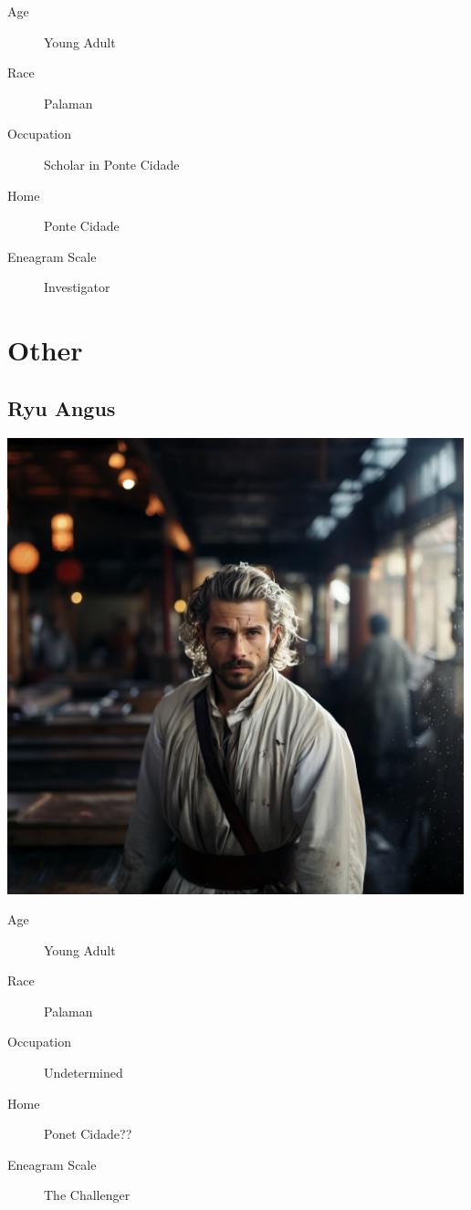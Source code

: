 \documentclass[11pt]{article}
\begin{document}
\begin{description}
\item[{Age}] Young Adult
\item[{Race}] Palaman
\item[{Occupation}] Scholar in Ponte Cidade
\item[{Home}] Ponte Cidade
\item[{Eneagram Scale}] Investigator
\end{description}
\section*{Other}
\label{sec:org814c882}
\subsection*{Ryu Angus}
\label{sec:org85082f9}

\begin{center}
\includegraphics[width=500px]{./img/Ryu_Angus.png}
\end{center}

\begin{description}
\item[{Age}] Young Adult
\item[{Race}] Palaman
\item[{Occupation}] Undetermined
\item[{Home}] Ponet Cidade??
\item[{Eneagram Scale}] The Challenger
\end{description}
\end{document}
